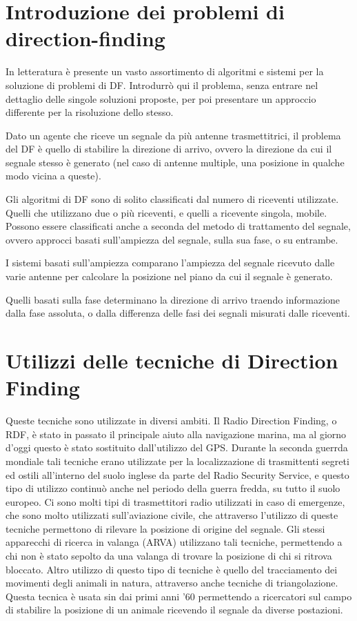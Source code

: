 \section{Introduzione dei problemi di direction-finding}

In letteratura è presente un vasto assortimento di algoritmi e sistemi per la soluzione di problemi di DF. Introdurrò qui il problema,
senza entrare nel dettaglio delle singole soluzioni proposte, per poi presentare un approccio differente per la risoluzione dello stesso.

Dato un agente che riceve un segnale da più antenne trasmettitrici, il problema del DF è quello di stabilire la direzione di arrivo,
ovvero la direzione da cui il segnale stesso è generato (nel caso di antenne multiple, una posizione in qualche modo vicina a queste).

Gli algoritmi di DF sono di solito classificati dal numero di riceventi utilizzate. Quelli che utilizzano due o più riceventi, e quelli
a ricevente singola, mobile. Possono essere classificati anche a seconda del metodo di trattamento del segnale, ovvero approcci basati
sull'ampiezza del segnale, sulla sua fase, o su entrambe. 

I sistemi basati sull'ampiezza comparano l'ampiezza del segnale ricevuto dalle varie antenne per calcolare la posizione nel piano da cui
il segnale è generato.

Quelli basati sulla fase determinano la direzione di arrivo traendo informazione dalla fase assoluta, o dalla differenza delle fasi dei 
segnali misurati dalle riceventi.

\section{Utilizzi delle tecniche di Direction Finding}
Queste tecniche sono utilizzate in diversi ambiti. Il Radio Direction Finding, o RDF, è stato in passato il principale aiuto alla navigazione marina, ma al giorno d'oggi questo è stato sostituito dall'utilizzo del GPS.
Durante la seconda guerrda mondiale tali tecniche erano utilizzate per la localizzazione di trasmittenti segreti ed ostili all'interno del suolo inglese da parte del  Radio Security Service, e questo tipo di utilizzo continuò anche nel periodo della guerra fredda, su tutto il suolo europeo.
Ci sono molti tipi di trasmettitori radio utilizzati in caso di emergenze, che sono molto utilizzati sull'aviazione civile, che attraverso l'utilizzo di queste tecniche permettono di rilevare la posizione di origine del segnale.
Gli stessi apparecchi di ricerca in valanga (ARVA) utilizzano tali tecniche, permettendo a chi non è stato sepolto da una valanga di trovare la posizione di chi si ritrova bloccato.
Altro utilizzo di questo tipo di tecniche è quello del tracciamento dei movimenti degli animali in natura, attraverso anche tecniche di triangolazione. Questa tecnica è usata sin dai primi anni '60 permettendo a ricercatori sul campo di stabilire la posizione di un animale ricevendo il segnale da diverse postazioni.
